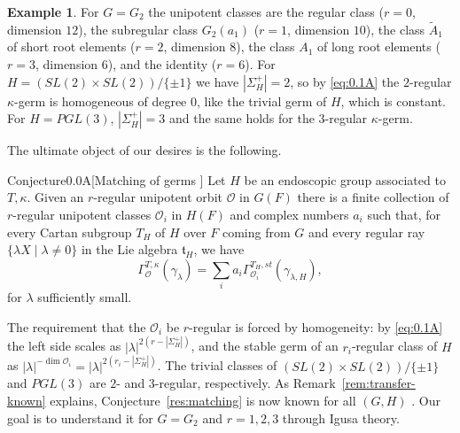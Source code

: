 \documentclass[12pt,letterpaper]{amsart}
\theoremstyle{plain}
\theoremstyle{definition}
\theoremstyle{remark}
\theoremstyle{definition}
\newtheorem*{example}{Example}
\begin{document}
\begin{example}
For $G=G_2$ the unipotent classes are the regular class ($r=0$, dimension
$12$), the subregular class $G_2(a_1)$ ($r=1$, dimension $10$), the class
$\tilde A_1$ of short root elements ($r=2$, dimension $8$), the class $A_1$ of
long root elements ($r=3$, dimension $6$), and the identity ($r=6$). For
$H=(SL(2)\times SL(2))/\{\pm1\}$ we have $|\Sigma_H^+|=2$, so by
\eqref{eq:0.1A} the $2$-regular $\kappa$-germ is homogeneous of degree $0$,
like the trivial germ of $H$, which is constant. For $H=PGL(3)$,
$|\Sigma_H^+|=3$ and the same holds for the $3$-regular $\kappa$-germ.
\end{example}

The ultimate object of our desires is the following.

\begin{res}{Conjecture}{0.0A}[Matching of germs \cite{LS89}]\label{res:matching}
Let $H$ be an endoscopic group
associated to $T,\kappa$. Given an $r$-regular
unipotent orbit ${\mathcal O}$ in $G(F)$ there is a finite collection
of $r$-regular unipotent classes ${\mathcal O}_i$ in $H(F)$ and complex
numbers $a_i$ such that, for every Cartan subgroup $T_H$ of $H$ over $F$
coming from $G$ and every
regular ray $\{\lambda X\mid\lambda\not=0\}$ in the Lie algebra ${\mathfrak t}_H$,
we have
\[
\Gamma_{{\mathcal O}}^{T,\kappa}(\gamma_\lambda)=
\sum_i a_i\Gamma_{{\mathcal O}_i}^{T_H,st}(\gamma_{\lambda,H} ),
\]
for $\lambda$ sufficiently small.
\end{res}

The requirement that the ${\mathcal O}_i$ be $r$-regular is forced by
homogeneity: by \eqref{eq:0.1A} the left side scales as
$|\lambda|^{2(r-|\Sigma_H^+|)}$, and the stable germ of an $r_i$-regular class
of $H$ as $|\lambda|^{-\dim{\mathcal O}_i}=|\lambda|^{2(r_i-|\Sigma_H^+|)}$.
The trivial classes of $(SL(2)\times SL(2))/\{\pm1\}$ and $PGL(3)$ are
$2$- and $3$-regular, respectively. As
Remark~\ref{rem:transfer-known} explains, Conjecture~\ref{res:matching} is
now known for all $(G,H)$ \cite{GH16}. Our goal is to understand it for $G=G_2$
and $r=1,2,3$ through Igusa theory.
\end{document}
